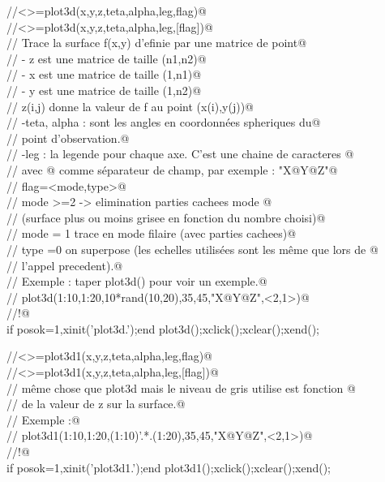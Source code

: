 
\verb@//<>=plot3d(x,y,z,teta,alpha,leg,flag)@ \\
\verb@//<>=plot3d(x,y,z,teta,alpha,leg,[flag])@ \\
\verb@// Trace la surface f(x,y) d'efinie par une matrice de point@ \\
\verb@// - z est une matrice de taille (n1,n2)@ \\
\verb@// - x est une matrice de taille (1,n1)@ \\
\verb@// - y est une matrice de taille (1,n2)@ \\
\verb@// z(i,j) donne la valeur de f au point (x(i),y(j))@ \\
\verb@// -teta, alpha : sont les angles en coordonn\'ees spheriques du@ \\
\verb@// point d'observation.@ \\
\verb@// -leg : la legende pour chaque axe. C'est une chaine de caracteres @ \\
\verb@//      avec @ comme s\'eparateur de champ, par exemple : "X@Y@Z"@ \\
\verb@// flag=<mode,type>@ \\
\verb@//   mode >=2 -> elimination parties cachees mode @ \\
\verb@//               (surface plus ou moins grisee en fonction du nombre choisi)@ \\
\verb@//   mode = 1 trace en mode filaire (avec parties cachees)@ \\
\verb@// type =0 on superpose (les echelles utilis\'ees sont les m\^eme que lors de @ \\
\verb@//         l'appel precedent).@ \\
\verb@// Exemple : taper plot3d() pour voir un exemple.@ \\
\verb@// plot3d(1:10,1:20,10*rand(10,20),35,45,"X@Y@Z",<2,1>)@ \\
\verb@//!@ \\
if posok=1,xinit('plot3d.');end
plot3d();xclick();xclear();xend();


\verb@//<>=plot3d1(x,y,z,teta,alpha,leg,flag)@ \\
\verb@//<>=plot3d1(x,y,z,teta,alpha,leg,[flag])@ \\
\verb@// m\^eme chose que plot3d mais le niveau de gris utilise est fonction @ \\
\verb@// de la valeur de z sur la surface.@ \\
\verb@// Exemple :@ \\
\verb@// plot3d1(1:10,1:20,(1:10)'.*.(1:20),35,45,"X@Y@Z",<2,1>)@ \\
\verb@//!@ \\
if posok=1,xinit('plot3d1.');end
plot3d1();xclick();xclear();xend();

